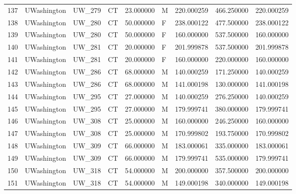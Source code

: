 \begin{tabular}{llllrlrrr}
137    &     UWashington &       UW\_279 &                 CT &  23.000000 &        M &       220.000259 &    466.250000 &  220.000259 \\
138    &     UWashington &       UW\_280 &                 CT &  50.000000 &        F &       238.000122 &    477.500000 &  238.000122 \\
139    &     UWashington &       UW\_280 &                 CT &  50.000000 &        F &       160.000000 &    537.500000 &  160.000000 \\
140    &     UWashington &       UW\_281 &                 CT &  20.000000 &        F &       201.999878 &    537.500000 &  201.999878 \\
141    &     UWashington &       UW\_281 &                 CT &  20.000000 &        F &       160.000000 &    220.000000 &  160.000000 \\
142    &     UWashington &       UW\_286 &                 CT &  68.000000 &        M &       140.000259 &    171.250000 &  140.000259 \\
143    &     UWashington &       UW\_286 &                 CT &  68.000000 &        M &       141.000198 &    130.000000 &  141.000198 \\
144    &     UWashington &       UW\_295 &                 CT &  27.000000 &        M &       140.000259 &    276.250000 &  140.000259 \\
145    &     UWashington &       UW\_295 &                 CT &  27.000000 &        M &       179.999741 &    380.000000 &  179.999741 \\
146    &     UWashington &       UW\_308 &                 CT &  25.000000 &        M &       160.000000 &    246.250000 &  160.000000 \\
147    &     UWashington &       UW\_308 &                 CT &  25.000000 &        M &       170.999802 &    193.750000 &  170.999802 \\
148    &     UWashington &       UW\_309 &                 CT &  66.000000 &        M &       183.000061 &    335.000000 &  183.000061 \\
149    &     UWashington &       UW\_309 &                 CT &  66.000000 &        M &       179.999741 &    535.000000 &  179.999741 \\
150    &     UWashington &       UW\_318 &                 CT &  54.000000 &        M &       200.000000 &    357.500000 &  200.000000 \\
151    &     UWashington &       UW\_318 &                 CT &  54.000000 &        M &       149.000198 &    340.000000 &  149.000198 \\

\end{tabular}
